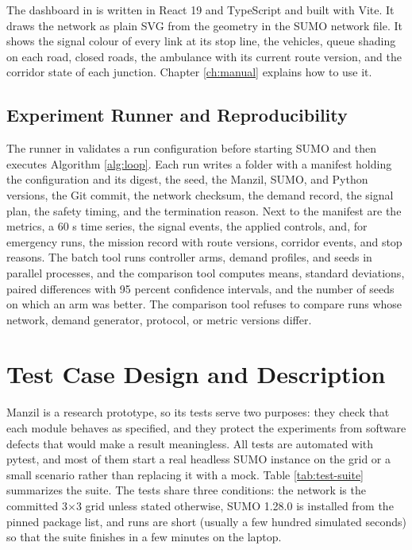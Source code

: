 The dashboard in  is written in React 19 and TypeScript and built with Vite. It draws the network as plain SVG from the geometry in the SUMO network file. It shows the signal colour of every link at its stop line, the vehicles, queue shading on each road, closed roads, the ambulance with its current route version, and the corridor state of each junction. Chapter \ref{ch:manual} explains how to use it.

\subsection{Experiment Runner and Reproducibility}

The runner in  validates a run configuration before starting SUMO and then executes Algorithm \ref{alg:loop}. Each run writes a folder with a manifest holding the configuration and its digest, the seed, the Manzil, SUMO, and Python versions, the Git commit, the network checksum, the demand record, the signal plan, the safety timing, and the termination reason. Next to the manifest are the metrics, a 60 s time series, the signal events, the applied controls, and, for emergency runs, the mission record with route versions, corridor events, and stop reasons. The batch tool runs controller arms, demand profiles, and seeds in parallel processes, and the comparison tool computes means, standard deviations, paired differences with 95 percent confidence intervals, and the number of seeds on which an arm was better. The comparison tool refuses to compare runs whose network, demand generator, protocol, or metric versions differ.

\section{Test Case Design and Description}

Manzil is a research prototype, so its tests serve two purposes: they check that each module behaves as specified, and they protect the experiments from software defects that would make a result meaningless. All tests are automated with pytest, and most of them start a real headless SUMO instance on the grid or a small scenario rather than replacing it with a mock. Table \ref{tab:test-suite} summarizes the suite. The tests share three conditions: the network is the committed 3$\times$3 grid unless stated otherwise, SUMO 1.28.0 is installed from the pinned package list, and runs are short (usually a few hundred simulated seconds) so that the suite finishes in a few minutes on the laptop.

